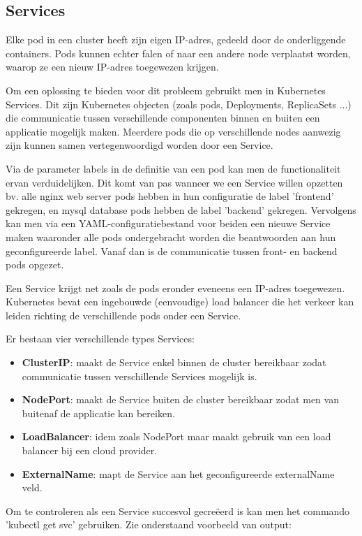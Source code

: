 \subsection{Services}
\label{sec:services}

Elke pod in een cluster heeft zijn eigen IP-adres, gedeeld door de onderliggende containers. Pods kunnen echter falen of naar een andere node verplaatst worden, waarop ze een nieuw IP-adres toegewezen krijgen.

Om een oplossing te bieden voor dit probleem gebruikt men in Kubernetes Services. Dit zijn Kubernetes objecten (zoals pods, Deployments, ReplicaSets ...) die communicatie tussen verschillende componenten binnen en buiten een applicatie mogelijk maken. Meerdere pods die op verschillende nodes aanwezig zijn kunnen samen vertegenwoordigd worden door een Service. 

Via de parameter labels in de definitie van een pod kan men de functionaliteit ervan verduidelijken. Dit komt van pas wanneer we een Service willen opzetten bv. alle nginx web server pods hebben in hun configuratie de label 'frontend' gekregen, en mysql database pods hebben de label 'backend' gekregen. Vervolgens kan men via een YAML-configuratiebestand voor beiden een nieuwe Service maken waaronder alle pods ondergebracht worden die beantwoorden aan hun geconfigureerde label. Vanaf dan is de communicatie tussen front- en backend pods opgezet. 

Een Service krijgt net zoals de pods eronder eveneens een IP-adres toegewezen. Kubernetes bevat een ingebouwde (eenvoudige) load balancer die het verkeer kan leiden richting de verschillende pods onder een Service. 

Er bestaan vier verschillende types Services: 
\begin{itemize}
    \item {\bf ClusterIP}: maakt de Service enkel binnen de cluster bereikbaar zodat communicatie tussen verschillende Services mogelijk is.  
    \item {\bf NodePort}: maakt de Service buiten de cluster bereikbaar zodat men van buitenaf de applicatie kan bereiken.
    \item {\bf LoadBalancer}: idem zoals NodePort maar maakt gebruik van een load balancer bij een cloud provider.
    \item {\bf ExternalName}: mapt de Service aan het geconfigureerde externalName veld.     
\end{itemize}

Om te controleren als een Service succesvol gecreëerd is kan men het commando 'kubectl get svc' gebruiken. Zie onderstaand voorbeeld van output:


